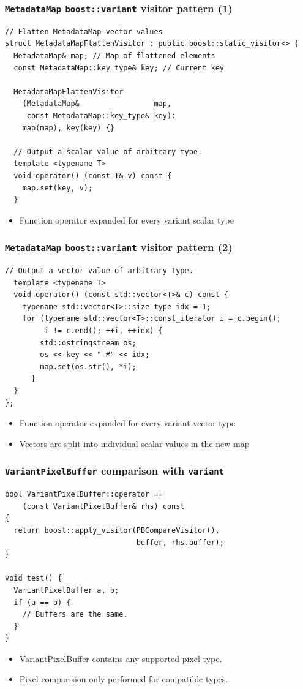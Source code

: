 \documentclass[handout]{beamer}
\begin{document}
\begin{frame}[fragile]
  \frametitle{\texttt{MetadataMap} \texttt{boost::variant} visitor pattern (1)}
    \footnotesize
    \begin{lstlisting}[basicstyle=\scriptsize\ttfamily,frame=tlr]
// Flatten MetadataMap vector values
struct MetadataMapFlattenVisitor : public boost::static_visitor<> {
  MetadataMap& map; // Map of flattened elements
  const MetadataMap::key_type& key; // Current key

  MetadataMapFlattenVisitor
    (MetadataMap&                 map,
     const MetadataMap::key_type& key):
    map(map), key(key) {}

  // Output a scalar value of arbitrary type.
  template <typename T>
  void operator() (const T& v) const {
    map.set(key, v);
  }
\end{lstlisting}
  \begin{itemize}
    \pause
  \item Function operator expanded for every variant scalar type
  \end{itemize}
\end{frame}

\begin{frame}[fragile]
  \frametitle{\texttt{MetadataMap} \texttt{boost::variant} visitor pattern (2)}
    \scriptsize
    \begin{lstlisting}[frame=blr]
  // Output a vector value of arbitrary type.
  template <typename T>
  void operator() (const std::vector<T>& c) const {
    typename std::vector<T>::size_type idx = 1;
    for (typename std::vector<T>::const_iterator i = c.begin();
         i != c.end(); ++i, ++idx) {
        std::ostringstream os;
        os << key << " #" << idx;
        map.set(os.str(), *i);
      }
  }
};
\end{lstlisting}
  \begin{itemize}
    \pause
  \item Function operator expanded for every variant vector type
  \item Vectors are split into individual scalar values in the new map
  \end{itemize}
\end{frame}

\begin{frame}[fragile]
  \frametitle{\texttt{VariantPixelBuffer} comparison with \texttt{variant}}
  \scriptsize
  \begin{lstlisting}
bool VariantPixelBuffer::operator ==
    (const VariantPixelBuffer& rhs) const
{
  return boost::apply_visitor(PBCompareVisitor(),
                              buffer, rhs.buffer);
}

void test() {
  VariantPixelBuffer a, b;
  if (a == b) {
    // Buffers are the same.
  }
}
\end{lstlisting}
  \begin{itemize}
    \pause
  \item VariantPixelBuffer contains any supported pixel type.
  \item Pixel comparision only performed for compatible types.
  \end{itemize}
\end{frame}
\end{document}
